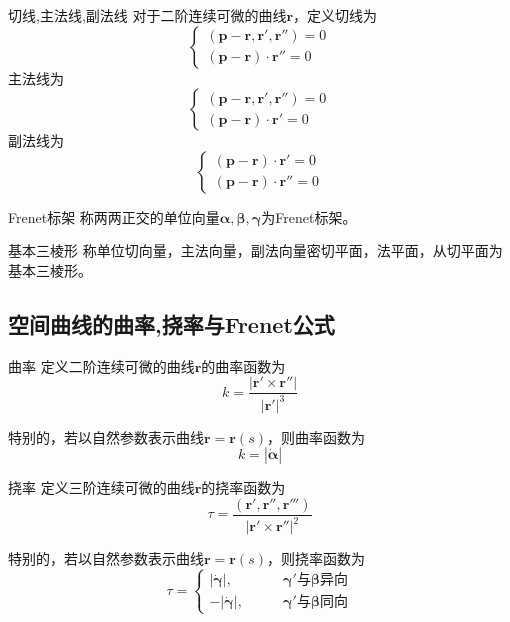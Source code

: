 \documentclass[lang = cn, scheme = chinese, thmcnt = section]{elegantbook}
\newcommand{\bs}{\boldsymbol}          %
\begin{document}
\begin{definition}{切线,主法线,副法线}
	对于二阶连续可微的曲线$\bs{r}$，定义切线为
	$$
	\begin{cases}
		(\bs{p}-\bs{r},\bs{r}',\bs{r}'')=0\\
		(\bs{p}-\bs{r})\cdot \bs{r}''=0
	\end{cases}
	$$
	主法线为
	$$
	\begin{cases}
		(\bs{p}-\bs{r},\bs{r}',\bs{r}'')=0\\
		(\bs{p}-\bs{r})\cdot \bs{r}'=0
	\end{cases}
	$$
	副法线为
	$$
	\begin{cases}
		(\bs{p}-\bs{r})\cdot \bs{r}'=0\\
		(\bs{p}-\bs{r})\cdot \bs{r}''=0
	\end{cases}
	$$
\end{definition}

\begin{definition}{Frenet标架}
	称两两正交的单位向量$\bs{\alpha},\bs{\beta},\bs{\gamma}$为Frenet标架。
\end{definition}

\begin{definition}{基本三棱形}
	称单位切向量，主法向量，副法向量密切平面，法平面，从切平面为基本三棱形。
\end{definition}

\subsection{空间曲线的曲率,挠率与Frenet公式}

\begin{definition}{曲率}
	定义二阶连续可微的曲线$\bs{r}$的曲率函数为
	$$
	k=\frac{|\bs{r}'\times\bs{r}''|}{|\bs{r}'|^3}
	$$
	
	特别的，若以自然参数表示曲线$\bs{r}=\bs{r}(s)$，则曲率函数为
	$$
	k=|\dot{\bs{\alpha}}|
	$$
\end{definition}

\begin{definition}{挠率}
	定义三阶连续可微的曲线$\bs{r}$的挠率函数为
	$$
	\tau=\frac{(\bs{r}',\bs{r}'',\bs{r}''')}{|\bs{r}'\times\bs{r}''|^2}
	$$
	
	特别的，若以自然参数表示曲线$\bs{r}=\bs{r}(s)$，则挠率函数为
	$$
	\tau=\begin{cases}
		|\dot{\bs{\gamma}}|,\qquad & \bs{\gamma}'\text{与}\bs{\beta}\text{异向}\\
		-|\dot{\bs{\gamma}}|,\qquad & \bs{\gamma}'\text{与}\bs{\beta}\text{同向}
	\end{cases}
	$$
\end{definition}
\end{document}
